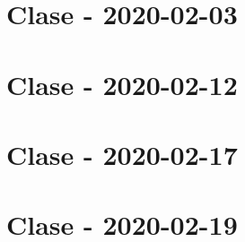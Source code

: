 \documentclass[openany]{book}
\begin{document}
\chapter{Clase - 2020-02-03}


\chapter{Clase - 2020-02-12}



\chapter{Clase - 2020-02-17}


\chapter{Clase - 2020-02-19}

\end{document}
